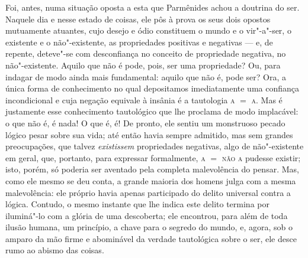 Foi, antes, numa situação oposta a esta que Parmênides achou a doutrina do
ser. Naquele dia e nesse estado de coisas, ele pôs à prova os seus dois
opostos mutuamente atuantes, cujo desejo e ódio constituem o mundo e o
vir"-a"-ser, o existente e o não"-existente, as propriedades positivas e
negativas --- e, de repente, deteve"-se com desconfiança no conceito de
propriedade negativa, no não"-existente. Aquilo que não é pode, pois, ser uma
propriedade? Ou, para indagar de modo ainda mais fundamental: aquilo que não
é, pode ser? Ora, a única forma de conhecimento no qual depositamos
imediatamente uma confiança incondicional e cuja negação equivale à insânia é
a tautologia \textsc{a} $=$ \textsc{a}. Mas é justamente esse conhecimento
tautológico que lhe proclama de modo implacável: o que não é, é nada! O que
é, é! De pronto, ele sentiu um monstruoso pecado lógico pesar sobre sua vida;
até então havia sempre admitido, mas sem grandes preocupações, que
talvez \textit{existissem} propriedades negativas, algo de não"-existente em
geral, que, portanto, para expressar formalmente, \textsc{a} $=$ \textsc{não a} 
pudesse existir; isto, porém, só poderia ser aventado pela completa
malevolência do pensar. Mas, como ele mesmo se deu conta, a grande maioria
dos homens julga com a mesma malevolência: ele próprio havia apenas
participado do delito universal contra a lógica. Contudo, o mesmo instante
que lhe indica este delito termina por iluminá"-lo com a glória de uma
descoberta; ele encontrou, para além de toda ilusão humana, um princípio, a
chave para o segredo do mundo, e, agora, sob o amparo da mão firme e
abominável da verdade tautológica sobre o ser, ele desce rumo ao abismo das
coisas.

